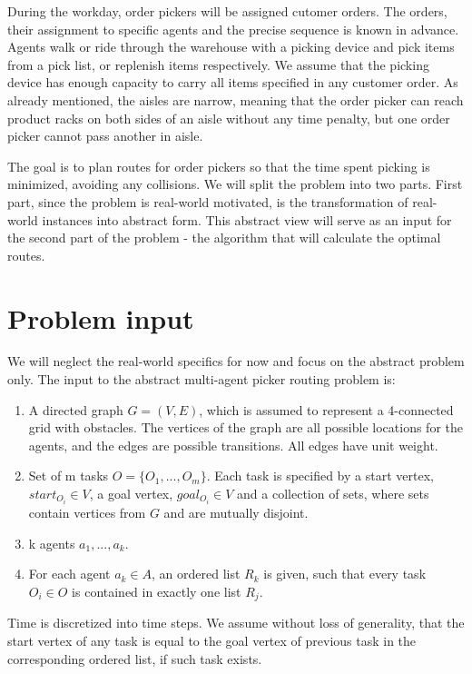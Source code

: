 During the workday, order pickers will be assigned cutomer orders. The orders, their assignment to specific agents and the precise sequence is known in advance. Agents walk or ride through the warehouse with a picking device and pick items from a pick list, or replenish items respectively. We assume that the picking device has enough capacity to carry all items specified in any customer order.
As already mentioned, the aisles are narrow, meaning that the order picker can reach product racks on both sides of an aisle without any time penalty, but one order picker cannot pass another in aisle.
\par

The goal is to plan routes for order pickers so that the time spent picking is minimized, avoiding any collisions. We will split the problem into two parts. First part, since the problem is real-world motivated, is the transformation of real-world instances into abstract form. This abstract view will serve as an input for the second part of the problem - the algorithm that will calculate the optimal routes.


\section{Problem input}
We will neglect the real-world specifics for now and focus on the abstract problem only. The input to the abstract multi-agent picker routing problem is:
 \begin{enumerate}
 \item A directed graph $G=(V,E)$, which is assumed to represent a 4-connected grid with obstacles. The vertices of the graph are all possible locations for the agents,  and the edges are possible transitions. All edges have unit weight.
 \item Set of m tasks $O=\{O_1,...,O_m\}$. Each task is specified by a start vertex, $start_{O_i} \in V$, a goal vertex, $ goal_{O_i} \in V$ and a collection of sets, where sets contain vertices from $G$ and are mutually disjoint.
 \item k agents $a_1,...,a_k$.
 
 \item For each agent $a_k \in A$, an ordered list $R_k$ is given, such that every task $O_i \in O$ is contained in exactly one list $R_j$.
  
 \end{enumerate}
 Time is discretized into time steps. We assume without loss of generality, that the start vertex of any task is equal to the goal vertex of previous task in the corresponding ordered list, if such task exists. 


